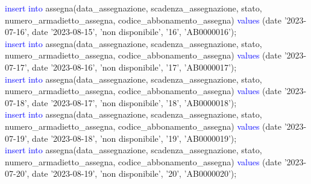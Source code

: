 \documentclass{article}
\begin{document}
\begin{flushleft}
{        \vspace{2mm}
        \hspace*{0.5em}\textcolor{blue}{insert into} assegna(data\_assegnazione, scadenza\_assegnazione, stato, \hspace*{0.5em}numero\_armadietto\_assegna, codice\_abbonamento\_assegna) \textcolor{blue}{values} \hspace*{0.5em}(date \hspace*{0.5em}'2023-07-16', date '2023-08-15', 'non disponibile', '16', 'AB0000016'); \\
        \newpage
        \hspace*{0.5em}\textcolor{blue}{insert into} assegna(data\_assegnazione, scadenza\_assegnazione, stato, \hspace*{0.5em}numero\_armadietto\_assegna, codice\_abbonamento\_assegna) \textcolor{blue}{values} \hspace*{0.5em}(date \hspace*{0.5em}'2023-07-17', date '2023-08-16', 'non disponibile', '17', 'AB0000017'); \\
        \vspace{2mm}
        \hspace*{0.5em}\textcolor{blue}{insert into} assegna(data\_assegnazione, scadenza\_assegnazione, stato, \hspace*{0.5em}numero\_armadietto\_assegna, codice\_abbonamento\_assegna) \textcolor{blue}{values} \hspace*{0.5em}(date \hspace*{0.5em}'2023-07-18', date '2023-08-17', 'non disponibile', '18', 'AB0000018'); \\
        \vspace{2mm}
        \hspace*{0.5em}\textcolor{blue}{insert into} assegna(data\_assegnazione, scadenza\_assegnazione, stato, \hspace*{0.5em}numero\_armadietto\_assegna, codice\_abbonamento\_assegna) \textcolor{blue}{values} \hspace*{0.5em}(date \hspace*{0.5em}'2023-07-19', date '2023-08-18', 'non disponibile', '19', 'AB0000019'); \\
        \vspace{2mm}
        \hspace*{0.5em}\textcolor{blue}{insert into} assegna(data\_assegnazione, scadenza\_assegnazione, stato, \hspace*{0.5em}numero\_armadietto\_assegna, codice\_abbonamento\_assegna) \textcolor{blue}{values} \hspace*{0.5em}(date \hspace*{0.5em}'2023-07-20', date '2023-08-19', 'non disponibile', '20', 'AB0000020'); \\
}
\end{flushleft}
\end{document}
